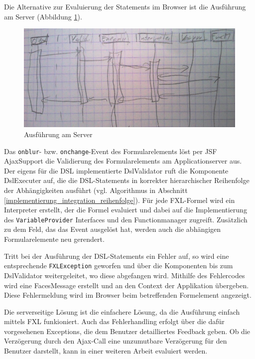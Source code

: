 Die Alternative zur Evaluierung der Statements im Browser ist die Ausführung am Server (Abbildung \ref{abb_uml_seq_server}).

\begin{figure}[ht]
\includegraphics[scale=0.5]{figures/uml_seq_server}
\caption{Ausführung am Server}
\label{abb_uml_seq_server}
\end{figure}

Das \texttt{onblur}- bzw. \texttt{onchange}-Event des Formularelements löst per JSF Ajax\-Support die Validierung des Formularelements am Applicationserver aus. Der eigens für die DSL implementierte DslValidator ruft die Komponente DslExecuter auf, die die DSL-Statements in korrekter hierarchischer Reihenfolge der Abhängigkeiten ausführt (vgl. Algorithmus in Abschnitt \ref{implementierung_integration_reihenfolge}). Für jede FXL-Formel wird ein Interpreter erstellt, der die Formel evaluiert und dabei auf die Implementierung des \texttt{VariableProvider} Interfaces und den Functionmanager zugreift. Zusätzlich zu dem Feld, das das Event ausgelöst hat, werden auch die abhängigen Formularelemente neu gerendert.

Tritt bei der Ausführung der DSL-Statements ein Fehler auf, so wird eine entsprechende \texttt{FXLException} geworfen und über die Komponenten bis zum DslValidator weitergeleitet, wo diese abgefangen wird. Mithilfe des Fehlercodes wird eine FacesMessage erstellt und an den Context der Applikation übergeben. Diese Fehlermeldung wird im Browser beim betreffenden Formelement angezeigt.

Die serverseitige Lösung ist die einfachere Lösung, da die Ausführung einfach mittels FXL funkioniert. Auch das Fehlerhandling erfolgt über die dafür vorgesehenen Exceptions, die dem Benutzer detailliertes Feedback geben. Ob die Verzögerung durch den Ajax-Call eine unzumutbare Verzögerung für den Benutzer darstellt, kann in einer weiteren Arbeit evaluiert werden. 


